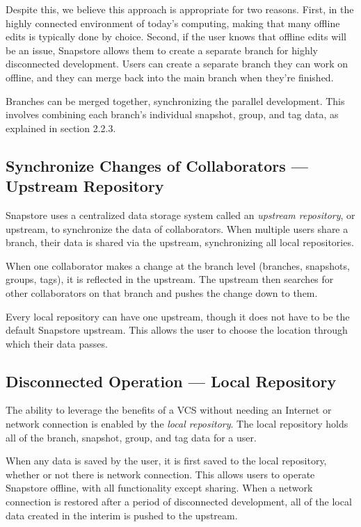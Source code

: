 Despite this, we believe this approach is appropriate for two reasons. First, in the highly connected environment of today's computing, making that many offline edits is typically done by choice. Second, if the user knows that offline edits will be an issue, Snapstore allows them to create a separate branch for highly disconnected development. Users can create a separate branch they can work on offline, and they can merge back into the main branch when they're finished.

Branches can be merged together, synchronizing the parallel development. This involves combining each branch's individual snapshot, group, and tag data, as explained in section 2.2.3.

\subsection{Synchronize Changes of Collaborators --- Upstream Repository}

Snapstore uses a centralized data storage system called an \textit{upstream repository}, or upstream, to synchronize the data of collaborators. When multiple users share a branch, their data is shared via the upstream, synchronizing all local repositories.

When one collaborator makes a change at the branch level (branches, snapshots, groups, tags), it is reflected in the upstream. The upstream then searches for other collaborators on that branch and pushes the change down to them.

Every local repository can have one upstream, though it does not have to be the default Snapstore upstream. This allows the user to choose the location through which their data passes.

\subsection{Disconnected Operation --- Local Repository}

The ability to leverage the benefits of a VCS without needing an Internet or network connection is enabled by the \textit{local repository}. The local repository holds all of the branch, snapshot, group, and tag data for a user.

When any data is saved by the user, it is first saved to the local repository, whether or not there is network connection. This allows users to operate Snapstore offline, with all functionality except sharing. When a network connection is restored after a period of disconnected development, all of the local data created in the interim is pushed to the upstream.

